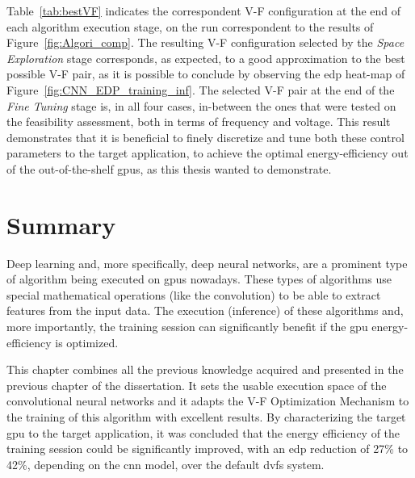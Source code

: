 Table~\ref{tab:bestVF} indicates the correspondent V-F configuration at the end of each algorithm execution stage, on the run correspondent to the results of Figure~\ref{fig:Algori_comp}. The resulting V-F configuration selected by the \textit{Space Exploration} stage corresponds, as expected, to a good approximation to the best possible V-F pair, as it is possible to conclude by observing the \acrshort{edp} heat-map of Figure~\ref{fig:CNN_EDP_training_inf}. 
The selected V-F pair at the end of the \textit{Fine Tuning} stage is, in all four cases, in-between the ones that were tested on the feasibility assessment, both in terms of frequency and voltage. This result demonstrates that it is beneficial to finely discretize and tune both these control parameters to the target application, to achieve the optimal energy-efficiency out of the out-of-the-shelf \acrshort{gpu}s, as this thesis wanted to demonstrate.



\begin{table}[htb]
    \centering
    \label{tab:bestVF}
     \caption{Mode of selected V-F configurations at the end of each optimization stage.}
\end{table}



\section{Summary}

Deep learning and, more specifically, deep neural networks, are a prominent type of algorithm being executed on \acrshort{gpu}s nowadays. These types of algorithms use special mathematical operations (like the convolution) to be able to extract features from the input data. The execution (inference) of these algorithms and, more importantly, the training session can significantly benefit if the \acrshort{gpu} energy-efficiency is optimized.

This chapter combines all the previous knowledge acquired and presented in the previous chapter of the dissertation. It sets the usable execution space of the convolutional neural networks and it adapts the V-F Optimization Mechanism to the training of this algorithm with excellent results. By characterizing the target \acrshort{gpu} to the target application, it was concluded that the energy efficiency of the training session could be significantly improved, with an \acrshort{edp} reduction of 27\% to 42\%, depending on the \acrshort{cnn} model, over the default \acrshort{dvfs} system.
